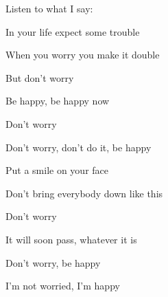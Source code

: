 Listen to what I say: 

In your life expect some trouble 

When you worry you make it double 

But don't worry

Be happy, be happy now
\ks

\zr
\kr

\zs
Don't worry 

Don't worry, don't do it, be happy 

Put a smile on your face 

Don't bring everybody down like this 
\ks

\zr
Don't worry

It will soon pass, whatever it is 

Don't worry, be happy 

I'm not worried, I'm happy
\kr

\kp

